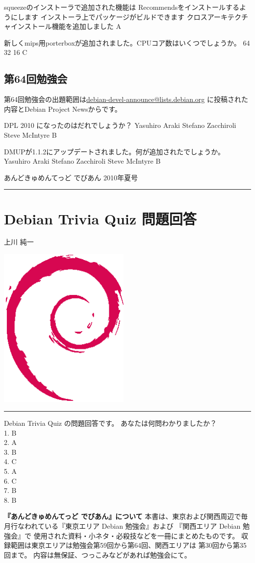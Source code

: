 \documentclass[mingoth,a4paper]{jsarticle}
\renewcommand{\dancersection}[2]{%
\newpage
あんどきゅめんてっど でびあん 2010年夏号
%
\vspace{0.1mm}\\
{\color{dancerlightblue}\rule{\hsize}{2mm}}

%
%
\begin{minipage}[t]{0.6\hsize}
\color{dancerdarkblue}
\vspace{1cm}
\section{#1}
\hfill{}#2\\
\end{minipage}
\begin{minipage}[t]{0.4\hsize}
\vspace{-2cm}
\hfill{}\includegraphics[height=8cm]{image200502/openlogo-nd.eps}\\
\vspace{-5cm}
\end{minipage}
%
%
{\color{dancerdarkblue}\rule{0.74\hsize}{2mm}}
%
\vspace{2cm}
}
\begin{document}
\santaku
{squeezeのインストーラで追加された機能は}
{Recommendsをインストールするようにします}
{インストーラ上でパッケージがビルドできます}
{クロスアーキテクチャインストール機能を追加しました}
{A}

\santaku
{新しくmips用porterboxが追加されました。CPUコア数はいくつでしょうか。}
{64}
{32}
{16}
{C}
 
 \subsection{第64回勉強会}
第64回勉強会の出題範囲は\url{debian-devel-announce@lists.debian.org} に投稿された内容とDebian Project Newsからです。


\santaku
{DPL 2010 になったのはだれでしょうか？}
{Yasuhiro Araki} %
{Stefano Zacchiroli}
{Steve McIntyre}
{B}


\santaku
{DMUPが1.1.2にアップデートされました。何が追加されたでしょうか。}
{Yasuhiro Araki} %
{Stefano Zacchiroli}
{Steve McIntyre}
{B}


\printindex

\cleartooddpage
\dancersection{Debian Trivia Quiz 問題回答}{上川 純一}

 Debian Trivia Quiz の問題回答です。
 あなたは何問わかりましたか？
 \\
1. B\\
2. A\\
3. B\\
4. C\\
5. A\\
6. C\\
7. B\\
8. B\\

\newpage
\thispagestyle{empty}\mbox{}%
\newpage

\thispagestyle{empty} 
{
\large
\begin{itembox}{\bf 『あんどきゅめんてっど でびあん』について}
本書は、東京および関西周辺で毎月行なわれている『東京エリア Debian 勉強会』および
『関西エリア Debian 勉強会』で
使用された資料・小ネタ・必殺技などを一冊にまとめたものです。
収録範囲は東京エリアは勉強会第59回から第64回、関西エリアは
第30回から第35回まで。
内容は無保証、つっこみなどがあれば勉強会にて。
\end{itembox}
}
\end{document}

